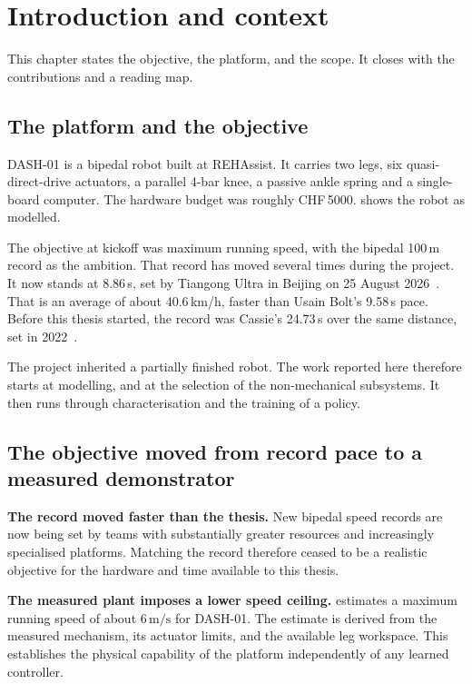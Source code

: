 \section{Introduction and context}
\label{sec:intro}

This chapter states the objective, the platform, and the scope. It closes with the contributions and a reading map.

\subsection{The platform and the objective}
\label{sec:intro-objective}

DASH-01 is a bipedal robot built at REHAssist. It carries two legs, six quasi-direct-drive
actuators, a parallel 4-bar knee, a passive ankle spring and a single-board computer. The hardware
budget was roughly CHF\,5000.  shows the robot as modelled.

The objective at kickoff was maximum running speed, with the bipedal 100\,m record as the ambition. 
That record has moved several times during the project. It now stands at 8.86\,s, set by Tiangong Ultra in Beijing on 25 August 2026~\cite{apnews2026chinese}. That is an average of about 40.6\,km/h, faster than Usain Bolt's 9.58\,s pace.
Before this thesis started, the record was Cassie's 24.73\,s over the same distance, set in 2022~\cite{crowley2024cassie}.

The project inherited a partially finished robot. The work reported here therefore
starts at modelling, and at the selection of the non-mechanical subsystems. It then runs through
characterisation and the training of a policy. 


\subsection{The objective moved from record pace to a measured demonstrator}
\label{sec:intro-reframe}

\textbf{The record moved faster than the thesis.} New bipedal speed records are now being set by
teams with substantially greater resources and increasingly specialised platforms. Matching the
record therefore ceased to be a realistic objective for the hardware and time available to this thesis.

\textbf{The measured plant imposes a lower speed ceiling.}  estimates a
maximum running speed of about $6\,\mathrm{m/s}$ for DASH-01. The estimate is derived from the
measured mechanism, its actuator limits, and the available leg workspace.
This establishes the physical capability of the platform independently of any learned controller.

